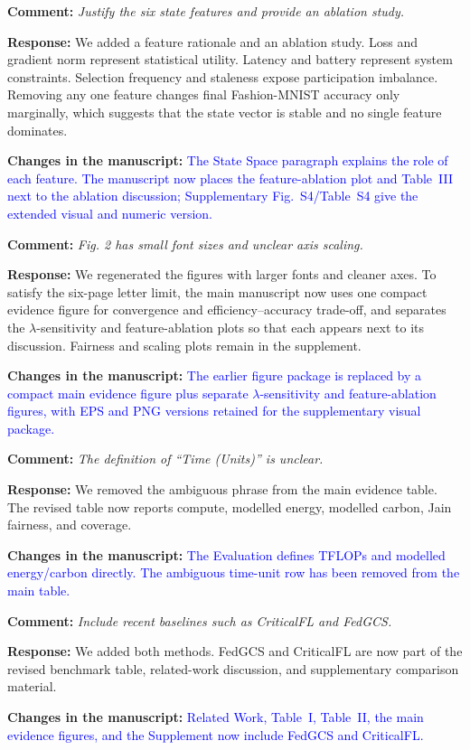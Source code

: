 \documentclass[11pt]{article}
\newcommand{\comment}[1]{\textbf{Comment:} \textit{#1}}
\newcommand{\response}[1]{\textbf{Response:} #1}
\newcommand{\change}[1]{\textbf{Changes in the manuscript:} \textcolor{blue}{#1}}
\begin{document}
\comment{Justify the six state features and provide an ablation study.}

\response{We added a feature rationale and an ablation study. Loss and gradient norm represent statistical utility. Latency and battery represent system constraints. Selection frequency and staleness expose participation imbalance. Removing any one feature changes final Fashion-MNIST accuracy only marginally, which suggests that the state vector is stable and no single feature dominates.}

\change{The State Space paragraph explains the role of each feature. The manuscript now places the feature-ablation plot and Table~III next to the ablation discussion; Supplementary Fig.~S4/Table~S4 give the extended visual and numeric version.}

\comment{Fig. 2 has small font sizes and unclear axis scaling.}

\response{We regenerated the figures with larger fonts and cleaner axes. To satisfy the six-page letter limit, the main manuscript now uses one compact evidence figure for convergence and efficiency--accuracy trade-off, and separates the $\lambda$-sensitivity and feature-ablation plots so that each appears next to its discussion. Fairness and scaling plots remain in the supplement.}

\change{The earlier figure package is replaced by a compact main evidence figure plus separate $\lambda$-sensitivity and feature-ablation figures, with EPS and PNG versions retained for the supplementary visual package.}

\comment{The definition of ``Time (Units)'' is unclear.}

\response{We removed the ambiguous phrase from the main evidence table. The revised table now reports compute, modelled energy, modelled carbon, Jain fairness, and coverage.}

\change{The Evaluation defines TFLOPs and modelled energy/carbon directly. The ambiguous time-unit row has been removed from the main table.}

\comment{Include recent baselines such as CriticalFL and FedGCS.}

\response{We added both methods. FedGCS and CriticalFL are now part of the revised benchmark table, related-work discussion, and supplementary comparison material.}

\change{Related Work, Table~I, Table~II, the main evidence figures, and the Supplement now include FedGCS and CriticalFL.}
\end{document}
